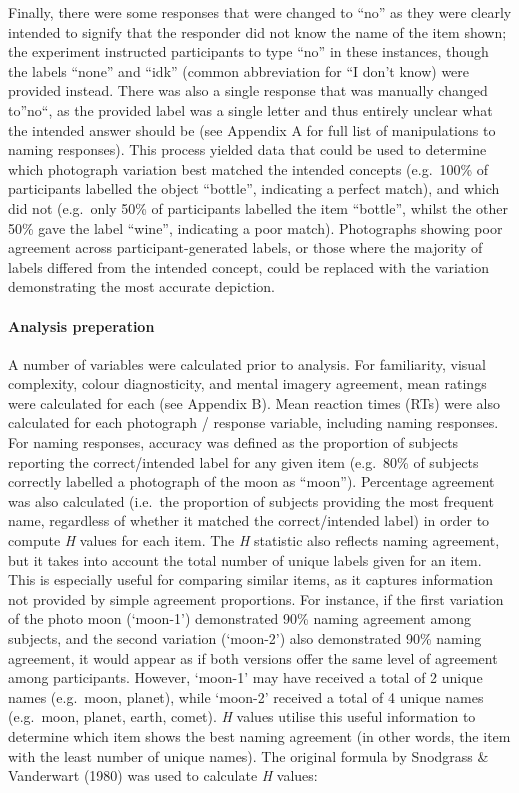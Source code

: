 \documentclass[
  11pt,
]{article}
\begin{document}
Finally, there were some responses that were changed to ``no'' as they
were clearly intended to signify that the responder did not know the
name of the item shown; the experiment instructed participants to type
``no'' in these instances, though the labels ``none'' and ``idk''
(common abbreviation for ``I don't know) were provided instead. There
was also a single response that was manually changed to''no``, as the
provided label was a single letter and thus entirely unclear what the
intended answer should be (see Appendix A for full list of manipulations
to naming responses). This process yielded data that could be used to
determine which photograph variation best matched the intended concepts
(e.g.~100\% of participants labelled the object ``bottle'', indicating a
perfect match), and which did not (e.g.~only 50\% of participants
labelled the item ``bottle'', whilst the other 50\% gave the label
``wine'', indicating a poor match). Photographs showing poor agreement
across participant-generated labels, or those where the majority of
labels differed from the intended concept, could be replaced with the
variation demonstrating the most accurate depiction.

\hypertarget{analysis-preperation}{%
\paragraph{Analysis preperation}\label{analysis-preperation}}

A number of variables were calculated prior to analysis. For
familiarity, visual complexity, colour diagnosticity, and mental imagery
agreement, mean ratings were calculated for each (see Appendix B). Mean
reaction times (RTs) were also calculated for each photograph / response
variable, including naming responses. For naming responses, accuracy was
defined as the proportion of subjects reporting the correct/intended
label for any given item (e.g.~80\% of subjects correctly labelled a
photograph of the moon as ``moon''). Percentage agreement was also
calculated (i.e.~the proportion of subjects providing the most frequent
name, regardless of whether it matched the correct/intended label) in
order to compute \emph{H} values for each item. The \emph{H} statistic
also reflects naming agreement, but it takes into account the total
number of unique labels given for an item. This is especially useful for
comparing similar items, as it captures information not provided by
simple agreement proportions. For instance, if the first variation of
the photo moon (`moon-1') demonstrated 90\% naming agreement among
subjects, and the second variation (`moon-2') also demonstrated 90\%
naming agreement, it would appear as if both versions offer the same
level of agreement among participants. However, `moon-1' may have
received a total of 2 unique names (e.g.~moon, planet), while `moon-2'
received a total of 4 unique names (e.g.~moon, planet, earth, comet).
\emph{H} values utilise this useful information to determine which item
shows the best naming agreement (in other words, the item with the least
number of unique names). The original formula by Snodgrass \& Vanderwart
(1980) was used to calculate \emph{H} values:
\end{document}
